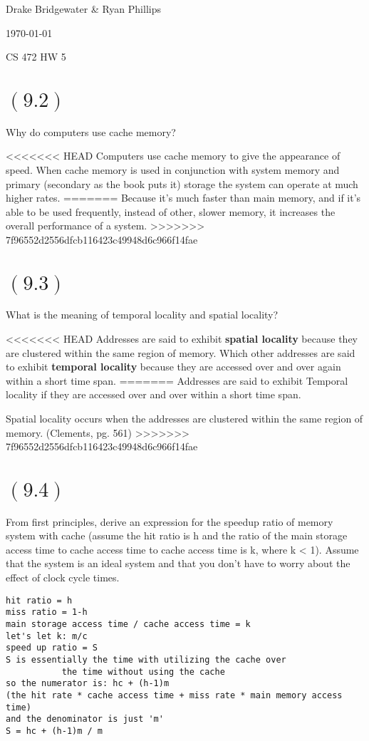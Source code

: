\documentclass[letterpaper,12pt,titlepage]{article}
\def\name{Drake Bridgewater \& Ryan Phillips}
\begin{document}
\hfill \name

\hfill \today

\hfill CS 472 HW 5

\section*{$(9.2)$} Why do computers use cache memory?

\begin{mdframed}[style=MyFrame]
<<<<<<< HEAD
Computers use cache memory to give the appearance of speed. When cache memory is used in conjunction with system memory and primary (secondary as the book puts it) storage the system can operate at much higher rates. 
=======
Because it's much faster than main memory, and if it's able to be used frequently, instead of other, slower memory, it increases the overall performance of a system.
>>>>>>> 7f96552d2556dfcb116423c49948d6c966f14fae
\end{mdframed}

\section*{$(9.3)$} What is the meaning of temporal locality and spatial locality?

\begin{mdframed}[style=MyFrame]
<<<<<<< HEAD
Addresses are said to exhibit \textbf{spatial locality} because they are clustered within the same region of memory. Which other addresses are said to exhibit \textbf{temporal locality} because they are accessed over and over again within a short time span.
=======
Addresses are said to exhibit Temporal locality if they are accessed over and over within a short time span.

Spatial locality occurs when the addresses are clustered within the same region of memory. (Clements, pg. 561)
>>>>>>> 7f96552d2556dfcb116423c49948d6c966f14fae
\end{mdframed}

\vspace{-0.2cm}
\section*{$(9.4)$} From first principles, derive an expression for the speedup ratio of memory system with cache (assume the hit ratio is h and the ratio of the main storage access time to cache access time to cache access time is k, where k < 1). Assume that the system is an ideal system and that you don't have to worry about the effect of clock cycle times.
\begin{mdframed}[style=MyFrame]
\begin{verbatim}
hit ratio = h
miss ratio = 1-h
main storage access time / cache access time = k
let's let k: m/c
speed up ratio = S
S is essentially the time with utilizing the cache over 
           the time without using the cache
so the numerator is: hc + (h-1)m 
(the hit rate * cache access time + miss rate * main memory access time)
and the denominator is just 'm'
S = hc + (h-1)m / m 
\end{verbatim}
\end{mdframed}
\end{document}

